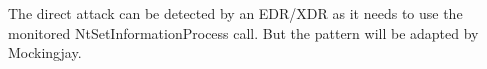 The direct attack can be detected by an EDR/XDR as it needs to use the monitored NtSetInformationProcess call.  But the pattern
will be adapted by Mockingjay.
















